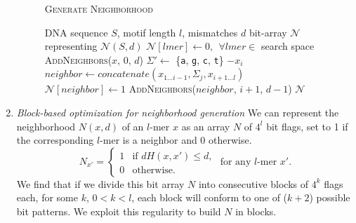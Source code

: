 \documentclass{acm_proc_article-sp}
\begin{document}
\begin{enumerate}
			\begin{figure}[h]
			\noindent \hspace*{6pt}{\bf Algorithm 2} \textsc{Generate Neighborhood}
			\begin{algorithmic}[1]
				\label{alg:recursive-nbr-gen}
				\Require DNA sequence $S$, motif length $l$, mismatches $d$
				\Ensure bit-array $\mathcal{N}$ representing $\mathcal{N}(S,d)$ \vspace*{6pt}
				\State $\mathcal{N}[lmer] \leftarrow 0,\ \ \forall lmer \in $ search space 
				\State \textsc{AddNeighbors}($x$, 0, $d$) \hspace*{9pt}
				\EndFor
				\State {}
						\State $\Sigma' \leftarrow$ \{\texttt{a}, \texttt{g}, \texttt{c}, \texttt{t}\} $- x_{i}$ \hspace*{4pt}
							\State $neighbor \leftarrow concatenate(x_{1...i-1},\Sigma_{j},x_{i+1...l})$
							\State $\mathcal{N}[neighbor] \leftarrow 1$
								\State \textsc{AddNeighbors}($neighbor$, $i+1$, $d-1$)
							\EndIf
						\EndFor
					\EndFor
				\EndProcedure
				\State\Return $\mathcal{N}$
				\end{algorithmic}
			\end{figure}
		\newpage
		\item{\em Block-based optimization for neighborhood generation}\newline
			We can represent the neighborhood $N(x,d)$ of an $l$-mer $x$ as an array $N$ of $4^{l}$ bit flags, set to 1 if the corresponding $l$-mer is a neighbor and 0 otherwise.
			\begin{equation*}
				N_{x'} = \left\{
				\begin{array}{rl}
					1 & \text{if } dH(x,x') \leq d,\\
					0 & \text{otherwise.}%
				\end{array} \right.
				\text{ for any $l$-mer }x'.
				\end{equation*}
			We find that if we divide this bit array $N$ into consecutive blocks of $4^{k}$ flags each, for some $k$, $0 < k < l$, each block will conform to one of ($k + 2$) possible bit patterns. We exploit this regularity to build $N$ in blocks.

\end{enumerate}
\end{document}
